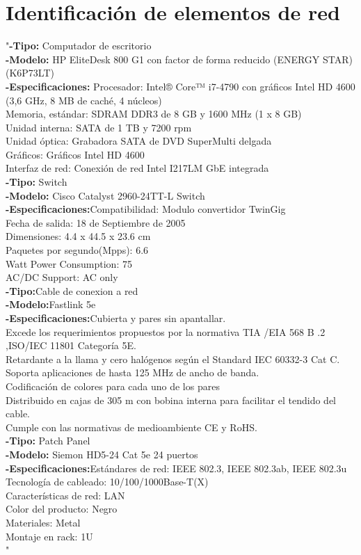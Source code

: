 \documentclass{udpreport}
\begin{document}
	\section{Identificación de elementos de red}
		"{\bf-Tipo:} Computador de escritorio\\
		{\bf-Modelo:}  HP EliteDesk 800 G1 con factor de forma reducido (ENERGY STAR)
		(K6P73LT)\\
		{\bf-Especificaciones:} Procesador:
		Intel® Core™ i7-4790 con gráficos Intel HD 4600 (3,6 GHz, 8 MB de caché, 4 núcleos)\\
		Memoria, estándar:
		SDRAM DDR3 de 8 GB y 1600 MHz (1 x 8 GB)\\
		Unidad interna:
		SATA de 1 TB y 7200 rpm\\
		Unidad óptica:
		Grabadora SATA de DVD SuperMulti delgada\\
		Gráficos:
		Gráficos Intel HD 4600\\
		Interfaz de red:
		Conexión de red Intel I217LM GbE integrada\\
		{\bf-Tipo:} Switch\\
		{\bf-Modelo:} Cisco Catalyst 2960-24TT-L Switch\\
		{\bf-Especificaciones:}Compatibilidad:
		Modulo convertidor TwinGig\\
		Fecha de salida:
		18 de Septiembre de 2005\\
		Dimensiones:
		4.4 x 44.5 x 23.6 cm\\
		Paquetes por segundo(Mpps):
		6.6\\
		Watt Power Consumption:	
		75\\
		AC/DC Support:
		AC only\\
		{\bf-Tipo:}Cable de conexion a red\\
		{\bf-Modelo:}Fastlink 5e\\
		{\bf-Especificaciones:}Cubierta y pares sin apantallar.\\
		Excede los requerimientos propuestos por la normativa TIA /EIA 568 B .2 ,ISO/IEC 11801 Categoría 5E.\\
		Retardante a la llama y cero halógenos según el Standard IEC 60332-3 Cat C.\\
		Soporta aplicaciones de hasta 125 MHz de ancho de banda.\\
		Codificación de colores para cada uno de los pares\\
		Distribuido en cajas de 305 m con bobina interna para facilitar el tendido del cable.\\
		Cumple con las normativas de medioambiente CE y RoHS.\\
		{\bf-Tipo:} Patch Panel\\
		{\bf-Modelo:} Siemon HD5-24 Cat 5e 24 puertos\\
		{\bf-Especificaciones:}Estándares de red: IEEE 802.3, IEEE 802.3ab, IEEE 802.3u\\
		Tecnología de cableado: 10/100/1000Base-T(X)\\
		Características de red: LAN\\
		Color del producto: Negro\\
		Materiales: Metal\\
		Montaje en rack: 1U\\"
\end{document}

